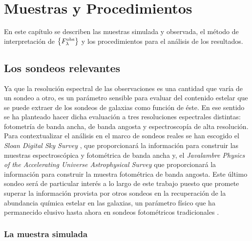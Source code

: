 \chapter{Muestras y Procedimientos}

\label{ch:samples-procedure}

En este capítulo se describen las muestras simulada y observada, el método de interpretación de
$\set{\sedt[F]{obs}}$ y los procedimientos para el análisis de los resultados.


\section{Los sondeos relevantes}

Ya que la resolución espectral de las observaciones es una cantidad que varía de un sondeo a otro,
es un parámetro sensible para evaluar del contenido estelar que se puede extraer de los sondeos de
galaxias como función de éste. En ese sentido se ha planteado hacer dicha evaluación a tres
resoluciones espectrales distintas: fotometría de banda ancha, de banda angosta y espectroscopía de
alta resolución. Para contextualizar el análisis en el marco de sondeos reales se han escogido el
\emph{Sloan Digital Sky Survey} \citep[SDSS,][]{York2000}, que proporcionará la información para
construir las muestras espectroscópica \citep{Strauss2002} y fotométrica de banda ancha
\citep{Gunn1998} y, el \emph{Javalambre Physics of the Accelerating Universe Astrophysical Survey}
\citep[J-PAS,][]{Benitez2014,Dupke2015} que proporcionará la información para construir la muestra
fotométrica de banda angosta. Este último sondeo será de particular interés a lo largo de este
trabajo puesto que promete superar la información provista por otros sondeos en la recuperación de
la abundancia química estelar en las galaxias, un parámetro físico que ha permanecido elusivo hasta
ahora en sondeos fotométricos tradicionales \citep[aún así véase,][]{MacArthur2010}.

\subsection{La muestra simulada}\label{sc:mock-sample}

